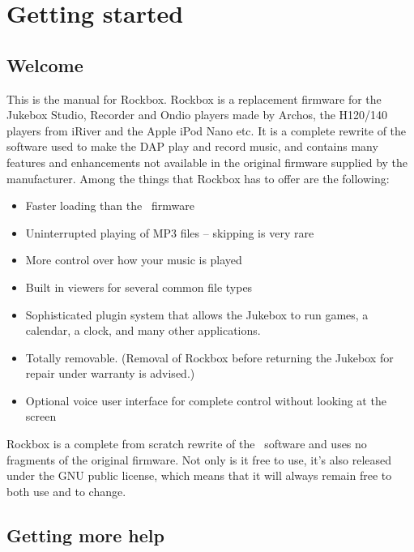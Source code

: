 \chapter{Getting started}
\section{Welcome}
This is the manual for Rockbox.  Rockbox is a replacement firmware for the
Jukebox Studio, Recorder and Ondio players made by Archos, the H120/140
players from iRiver and the Apple iPod Nano etc.  It is a complete rewrite of
the software used to make the DAP play and record music, and contains many
features and enhancements not available in the original firmware supplied by
the manufacturer.  Among the things that Rockbox has to offer are the
following:

\begin{itemize}
\item Faster loading than the \playername\ firmware
\item Uninterrupted playing of MP3 files {--} skipping is very rare
\item More control over how your music is played
\item Built in viewers for several common file types
\item Sophisticated plugin system that allows the Jukebox to run games,
a calendar, a clock, and many other applications.
\item Totally removable. (Removal of Rockbox before returning the
Jukebox for repair under warranty is advised.)
\item Optional voice user interface for complete control without looking
at the screen
\end{itemize}
Rockbox is a complete from scratch rewrite of the \playername\ software and
uses no fragments of the original firmware.  Not only is it free to
use, it's also released under the GNU public license,
which means that it will always remain free to both use and to change.


\section{Getting more help}

